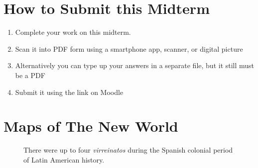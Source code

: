 \documentclass[10pt]{article}
\begin{document}
\maketitle

\section{How to Submit this Midterm}

\begin{enumerate}
\item Complete your work on this midterm.
\item Scan it into PDF form using a smartphone app, scanner, or digital picture
\item Alternatively you can type up your answers in a separate file, but it still must be a PDF
\item Submit it using the link on Moodle
\end{enumerate}

\section{Maps of The New World}

\begin{figure}[ht]
\centering
\caption{\label{fig:map1} There were up to four \textit{virreinatos} during the Spanish colonial period of Latin American history.}
\end{figure}
\end{document}
